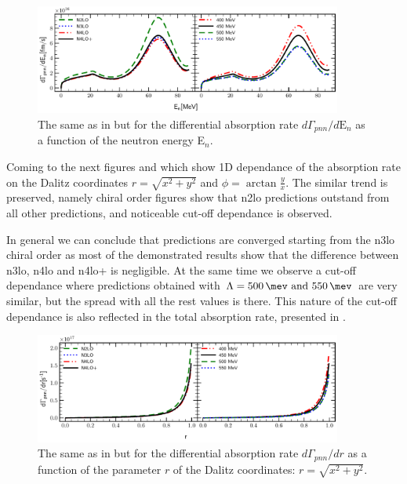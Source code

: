     \begin{figure}[h]
        \begin{center}
        \includegraphics[width=0.9\textwidth]{PlotData/PION/Dalitz_maps/figures/3HE_dGdEn.pdf}
        \end{center}
        \caption{The same as in  but for the differential absorption rate $d\Gamma_{pnn} /d\text{E}_n$
        as a function of the neutron energy E$_n$.}
        \label{pion_dGdEn}
    \end{figure}

    Coming to the next figures  and  which show 1D dependance of the
    absorption rate on the Dalitz coordinates $r = \sqrt{x^2 + y^2}$  and $\phi = \arctan \frac{y}{x}$.
    The similar trend is preserved, namely chiral order figures show that \gls{n2lo} predictions
    outstand from all other predictions, and noticeable cut-off dependance is observed.

    In general we can conclude that predictions are converged starting from the \gls{n3lo} chiral order as
    most of the demonstrated results show that the difference between \gls{n3lo}, \gls{n4lo} and 
    \gls{n4lo+} is negligible. At the same time we observe a cut-off dependance where 
    predictions obtained with $\Lambda=\SIlist{500;550}{\mev}$ are very similar, but the spread with
    all the rest values is there. This nature of the cut-off dependance is also reflected in the total absorption 
    rate, presented in . 

    \begin{figure}[h]
        \begin{center}
        \includegraphics[width=0.9\textwidth]{PlotData/PION/Dalitz_maps/figures/3HE_dGdr.pdf}
        \end{center}
        \caption{The same as in  but for the differential absorption rate $d\Gamma_{pnn} /dr$
        as a function of the parameter $r$ of the Dalitz coordinates: $r = \sqrt{x^2 + y^2}$.}
        \label{pion_dGdEr}
    \end{figure}

